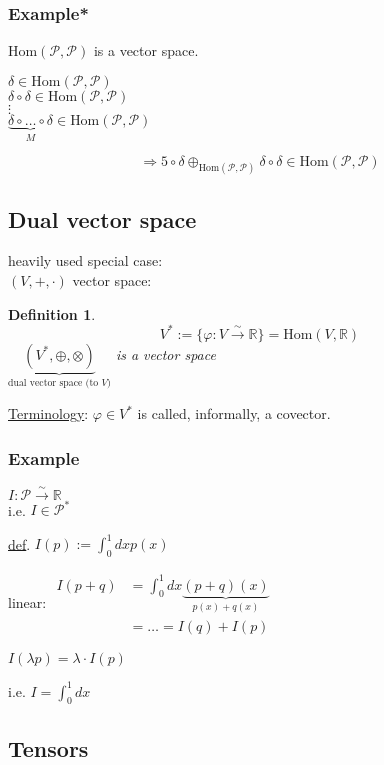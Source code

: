 \documentclass[10pt, twoside]{amsart}
\newtheorem{definition}{Definition}
\begin{document}
\begin{multicols*}{2}
\subsubsection{Example*} $\text{Hom}(\mathcal{P},\mathcal{P})$ is a vector space.

$\delta \in \text{Hom}(\mathcal{P},\mathcal{P})$ \\
$\delta \circ \delta \in \text{Hom}(\mathcal{P},\mathcal{P})$ \\
$\vdots$ \\
$\underbrace{ \delta \circ \dots \circ \delta }_{ M} \in \text{Hom}(\mathcal{P}, \mathcal{P})$

\[
\Longrightarrow 5 \circ \delta \oplus_{\text{Hom}(\mathcal{P},\mathcal{P})} \delta \circ \delta \in \text{Hom}(\mathcal{P},\mathcal{P})
\]

\subsection{Dual vector space}

heavily used special case: \\
$(V,+,\cdot)$ vector space:  
\begin{definition}
\[
V^* := \lbrace \varphi : V \xrightarrow{ \sim } \mathbb{R} \rbrace = \text{Hom}(V,\mathbb{R})
\]
$\underbrace{ (V^*, \oplus, \otimes) }_{\text{dual vector space (to $V$)}}$ is a vector space
\end{definition}

\underline{Terminology}: $\varphi \in V^*$ is called, informally, a covector.  

\subsubsection*{Example} $I : \mathcal{P} \xrightarrow{ \sim} \mathbb{R}$ \\
i.e. $I \in \mathcal{P}^*$

\underline{def}. $I(p) := \int_0^1 dx p(x)$

linear: $\begin{aligned}  I(p+q) & = \int_0^1 dx \underbrace{ ( p+q)(x) }_{p(x) + q(x)} \\
  & = \dots = I(q) + I(p) \end{aligned}$

$I(\lambda p) = \lambda \cdot I(p)$

i.e. $I = \int_0^1 dx$

\subsection{Tensors}


\end{multicols*}
\end{document}
